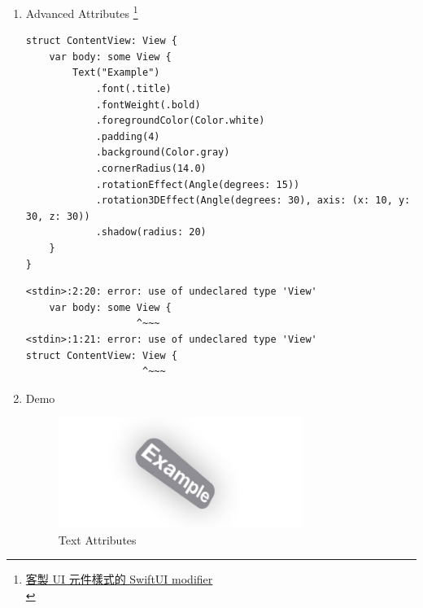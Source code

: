 \documentclass[a4paper,12pt]{article}
\begin{document}
\begin{enumerate}
\item Advanced Attributes \footnote{\href{https://medium.com/\%E5\%BD\%BC\%E5\%BE\%97\%E6\%BD\%98\%E7\%9A\%84-swift-ios-app-\%E9\%96\%8B\%E7\%99\%BC\%E5\%95\%8F\%E9\%A1\%8C\%E8\%A7\%A3\%E7\%AD\%94\%E9\%9B\%86/\%E5\%AE\%A2\%E8\%A3\%BD-ui-\%E5\%85\%83\%E4\%BB\%B6\%E6\%A8\%A3\%E5\%BC\%8F\%E7\%9A\%84-swiftui-modifier-b31ff65c1f0d}{客製 UI 元件樣式的 SwiftUI modifier}\\}
\label{sec:org4a50ae5}
\lstset{breaklines=true,language=swift,label= ,caption= ,captionpos=b,firstnumber=1,numbers=left}
\begin{lstlisting}
struct ContentView: View {
    var body: some View {
        Text("Example")
            .font(.title)
            .fontWeight(.bold)
            .foregroundColor(Color.white)
            .padding(4)
            .background(Color.gray)
            .cornerRadius(14.0)
            .rotationEffect(Angle(degrees: 15))
            .rotation3DEffect(Angle(degrees: 30), axis: (x: 10, y: 30, z: 30))
            .shadow(radius: 20)
    }
}
\end{lstlisting}

\begin{verbatim}
<stdin>:2:20: error: use of undeclared type 'View'
    var body: some View {
                   ^~~~
<stdin>:1:21: error: use of undeclared type 'View'
struct ContentView: View {
                    ^~~~
\end{verbatim}

\item Demo
\label{sec:orge491d73}
\begin{figure}[htbp]
\centering
\includegraphics[width=300]{images/adv-text-attributes.jpg}
\caption{\label{fig:Adv-Text_Attributes}Text Attributes}
\end{figure}
\end{enumerate}
\end{document}
